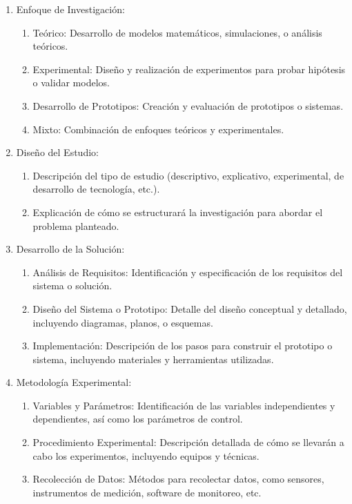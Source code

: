 \begin{enumerate}
    \item Enfoque de Investigación:
    \begin{enumerate}
        \item Teórico: Desarrollo de modelos matemáticos, simulaciones, o análisis teóricos.
        \item Experimental: Diseño y realización de experimentos para probar hipótesis o validar modelos.
        \item Desarrollo de Prototipos: Creación y evaluación de prototipos o sistemas.
        \item Mixto: Combinación de enfoques teóricos y experimentales.
    \end{enumerate}
    \item Diseño del Estudio:
    \begin{enumerate}
        \item Descripción del tipo de estudio (descriptivo, explicativo, experimental, de desarrollo de tecnología, etc.).
        \item Explicación de cómo se estructurará la investigación para abordar el problema planteado.
    \end{enumerate}
    \item Desarrollo de la Solución:
    \begin{enumerate}
        \item Análisis de Requisitos: Identificación y especificación de los requisitos del sistema o solución.
        \item Diseño del Sistema o Prototipo: Detalle del diseño conceptual y detallado, incluyendo diagramas, planos, o esquemas.
        \item Implementación: Descripción de los pasos para construir el prototipo o sistema, incluyendo materiales y herramientas utilizadas.
    \end{enumerate}
    \item Metodología Experimental:
    \begin{enumerate}
        \item Variables y Parámetros: Identificación de las variables independientes y dependientes, así como los parámetros de control.
        \item Procedimiento Experimental: Descripción detallada de cómo se llevarán a cabo los experimentos, incluyendo equipos y técnicas.
        \item Recolección de Datos: Métodos para recolectar datos, como sensores, instrumentos de medición, software de monitoreo, etc.

\end{enumerate}
\end{enumerate}
